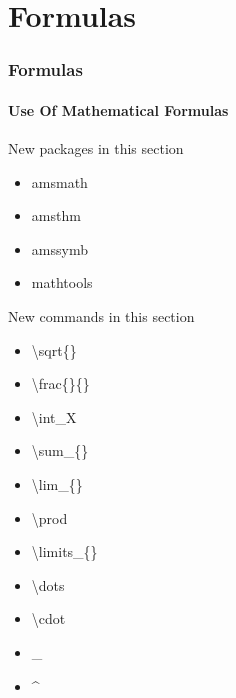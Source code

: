\section{Formulas}
\begin{frame}
\frametitle{Formulas}
\framesubtitle{Use Of Mathematical Formulas}

\begin{exampleblock}{New packages in this section}
\begin{multicols}{2}
\begin{itemize}
\item amsmath 
\item amsthm
\item amssymb
\item mathtools
\end{itemize}
\end{multicols}
\end{exampleblock}

\begin{block}{New commands in this section}
\begin{multicols}{2}
\begin{itemize}
\item \color{nounibaredI}\textbackslash sqrt\color{black}\{\}
\item \color{nounibaredI}\textbackslash frac\color{black}\{\}\{\}
\item \color{nounibaredI}\textbackslash int\color{black}\_X
\item \color{nounibaredI}\textbackslash sum\color{black}\_\{\}
\item \color{nounibaredI}\textbackslash lim\color{black}\_\{\}
\item \color{nounibaredI}\textbackslash prod\color{black}
\item \color{nounibaredI}\textbackslash limits\color{black}\_\{\}
\item \color{nounibaredI}\textbackslash dots\color{black}
\item \color{nounibaredI}\textbackslash cdot\color{black}
\item \color{nounibaredI}\_\color{black}
\item \color{nounibaredI}\^~\color{black}
\end{itemize}
\end{multicols}
\end{block}

\end{frame}

